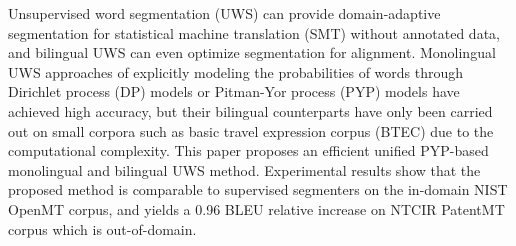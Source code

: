 Unsupervised word segmentation (UWS) can provide domain-adaptive segmentation for statistical machine translation (SMT) without annotated data, and bilingual UWS can even optimize segmentation for alignment. Monolingual UWS approaches of explicitly modeling the probabilities of words through Dirichlet process (DP) models or Pitman-Yor process (PYP) models have achieved high accuracy, but their bilingual counterparts have only been carried out on small corpora such as basic travel expression corpus (BTEC) due to the computational complexity. This paper proposes an efficient unified PYP-based monolingual and bilingual UWS method. Experimental results show that the proposed method is comparable to supervised segmenters on the in-domain NIST OpenMT corpus, and yields a 0.96 BLEU relative increase on NTCIR PatentMT corpus which is out-of-domain.

